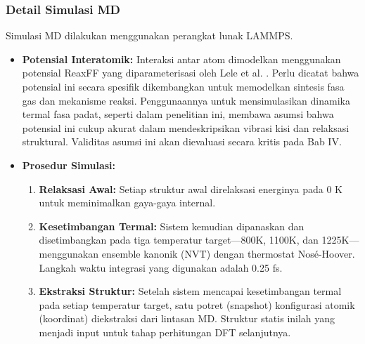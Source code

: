 \subsubsection{Detail Simulasi MD}
Simulasi MD dilakukan menggunakan perangkat lunak LAMMPS.
\begin{itemize}
    \item \textbf{Potensial Interatomik:} Interaksi antar atom dimodelkan menggunakan potensial ReaxFF yang diparameterisasi oleh Lele et al.
\citep{Lele2022}. Perlu dicatat bahwa potensial ini secara spesifik dikembangkan untuk memodelkan sintesis fasa gas dan mekanisme reaksi.
Penggunaannya untuk mensimulasikan dinamika termal fasa padat, seperti dalam penelitian ini, membawa asumsi bahwa potensial ini cukup akurat dalam mendeskripsikan vibrasi kisi dan relaksasi struktural.
Validitas asumsi ini akan dievaluasi secara kritis pada Bab IV.
\item \textbf{Prosedur Simulasi:}
    \begin{enumerate}
        \item \textbf{Relaksasi Awal:} Setiap struktur awal direlaksasi energinya pada 0 K untuk meminimalkan gaya-gaya internal.
\item \textbf{Kesetimbangan Termal:} Sistem kemudian dipanaskan dan disetimbangkan pada tiga temperatur target—800K, 1100K, dan 1225K—menggunakan ensemble kanonik (NVT) dengan thermostat Nosé-Hoover.
Langkah waktu integrasi yang digunakan adalah 0.25 fs.
        \item \textbf{Ekstraksi Struktur:} Setelah sistem mencapai kesetimbangan termal pada setiap temperatur target, satu potret (snapshot) konfigurasi atomik (koordinat) diekstraksi dari lintasan MD.
Struktur statis inilah yang menjadi input untuk tahap perhitungan DFT selanjutnya.
\end{enumerate}
\end{itemize}

